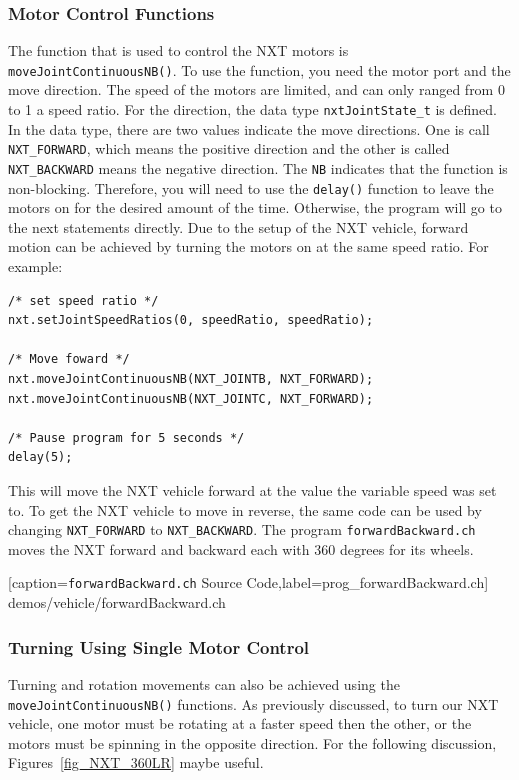\documentclass[11pt]{article}
\begin{document}
\subsubsection{Motor Control Functions}
The function that is used to control the NXT motors is {\tt moveJointContinuousNB()}. 
To use the function, you need the motor port and the move direction. The speed 
of the motors are limited, and can only ranged from 0 to 1 a speed ratio. For 
the direction, the data type {\tt nxtJointState\_t} is defined. In the data type, 
there are two values indicate the move directions. One is call {\tt NXT\_FORWARD},
which means the positive direction and the other is called {\tt NXT\_BACKWARD} 
means the negative direction. The {\tt NB} indicates that the function is 
non-blocking. Therefore, you will need to use the {\tt delay()} function to leave 
the motors on for the desired amount of the time. Otherwise, the program will go 
to the next statements directly. Due to the setup of the NXT vehicle, forward 
motion can be achieved by turning the motors on at the same speed ratio. For 
example:
\begin{lstlisting}
/* set speed ratio */
nxt.setJointSpeedRatios(0, speedRatio, speedRatio);

/* Move foward */
nxt.moveJointContinuousNB(NXT_JOINTB, NXT_FORWARD);
nxt.moveJointContinuousNB(NXT_JOINTC, NXT_FORWARD);

/* Pause program for 5 seconds */
delay(5);
\end{lstlisting}
This will move the NXT vehicle forward at the value the variable speed was set to. 
To get the NXT vehicle to move in reverse, the same code can be used by changing 
{\tt NXT\_FORWARD} to {\tt NXT\_BACKWARD}. The program {\tt forwardBackward.ch} 
moves the NXT forward and backward each with 360 degrees for its wheels.

    [caption={{\tt forwardBackward.ch} Source Code},label=prog_forwardBackward.ch]
    {demos/vehicle/forwardBackward.ch}
\subsubsection{Turning Using Single Motor Control}
Turning and rotation movements can also be achieved using the 
{\tt moveJointContinuousNB()} functions. As previously discussed, to turn our 
NXT vehicle, one motor must be rotating at a faster speed then the other, or 
the motors must be spinning in the opposite direction. For the following 
discussion, Figures~\ref{fig_NXT_360LR} maybe useful.\\
\end{document}
